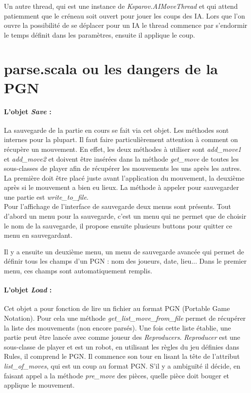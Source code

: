 \documentclass[a4paper]{article}
\begin{document}
Un autre thread, qui est une instance de \textit{Ksparov.AIMoveThread} et qui attend patiemment que le créneau soit ouvert pour jouer les coups des IA. Lors que l'on ouvre la possibilité de se déplacer pour un IA le thread commence par s'endormir le temps définit dans les paramètres, ensuite il applique le coup. 

\section{parse.scala ou les dangers de la PGN}
\label{parse}

\paragraph{L'objet \textit{Save} :} La sauvegarde de la partie en cours se fait via cet objet. Les méthodes sont internes pour la plupart. Il faut faire particulièrement attention à comment on récupère un mouvement. En effet, les deux méthodes à utiliser sont \textit{add\_move1} et \textit{add\_move2} et doivent être insérées dans la méthode \textit{get\_move} de toutes les sous-classes de player afin de récupérer les mouvements les uns après les autres. La première doit être placé juste avant l'application du mouvement, la deuxième après si le mouvement a bien eu lieux. La méthode à appeler pour sauvegarder une partie est \textit{write\_to\_file}. \\

Pour l'affichage de l'interface de sauvegarde deux menus sont présents. Tout d'abord un menu pour la sauvegarde, c'est un menu qui ne permet que de choisir le nom de la sauvegarde, il propose ensuite plusieurs buttons pour quitter ce menu en sauvegardant. 

Il y a ensuite un deuxième menu, un menu de sauvegarde avancée qui permet de définir tous les champs d'un PGN : nom des joueurs, date, lieu... Dans le premier menu, ces champs sont automatiquement remplis.

\paragraph{L'objet \textit{Load} :} Cet objet a pour fonction de lire un fichier au format PGN (Portable Game Notation). Pour cela une méthode \textit{get\_list\_move\_from\_file} permet de récupérer la liste des mouvements (non encore parsés). Une fois cette liste établie, une partie peut être lancée avec comme joueur des \textit{Reproducers}. \textit{Reproducer} est une sous-classe de player et est un robot, en utilisant les règles du jeu définies dans Rules, il comprend le PGN. Il commence son tour en lisant la tête de l'attribut \textit{list\_of\_moves}, qui est un coup au format PGN. S'il y a ambiguïté il décide, en faisant appel a la méthode \textit{pre\_move} des pièces, quelle pièce doit bouger et applique le mouvement. \\
\end{document}
